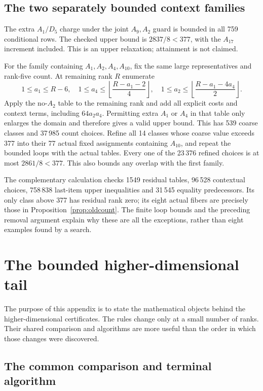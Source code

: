 \documentclass[11pt]{article}
\theoremstyle{remark}\newtheorem{remark}[theorem]{Remark}
\begin{document}
\subsection{The two separately bounded context families}

The extra $A_1/D_5$ charge under the joint $A_9,A_2$ guard is
bounded in all 759 conditional rows. The checked upper bound is
$2837/8<377$, with the $A_{17}$ increment included. This is an
upper relaxation; attainment is not claimed.

For the family containing $A_1,A_2,A_4,A_{10}$, fix the same
large representatives and rank-five count. At remaining rank $R$
enumerate
\[
 1\le a_1\le R-6,\quad
 1\le a_4\le\left\lfloor\frac{R-a_1-2}{4}\right\rfloor,
 \quad
 1\le a_2\le\left\lfloor\frac{R-a_1-4a_4}{2}\right\rfloor.
\]
Apply the no-$A_2$ table to the remaining rank and add all explicit
costs and context terms, including $64a_2a_4$. Permitting extra
$A_1$ or $A_4$ in that table only enlarges the domain and therefore
gives a valid upper bound. This has 539 coarse classes and
37\,985 count choices. Refine all 14 classes whose coarse value
exceeds 377 into their 77 actual fixed assignments containing
$A_{10}$, and repeat the bounded loops with the actual tables.
Every one of the 23\,376 refined choices is at most $2861/8<377$.
This also bounds any overlap with the first family.

The complementary calculation checks 1549 residual tables,
96\,528 contextual choices, 758\,838 last-item upper inequalities
and 31\,545 equality predecessors. Its only class above 377 has
residual rank zero; its eight actual fibers are precisely those
in Proposition~\ref{prop:oldcount}. The finite loop bounds and
the preceding removal argument explain why these are all the
exceptions, rather than eight examples found by a search.

\section{The bounded higher-dimensional tail}\label{app:tail}

The purpose of this appendix is to state the mathematical objects behind
the higher-dimensional certificates. The rules change only at a small
number of ranks. Their shared comparison and algorithms are more useful
than the order in which those changes were discovered.

\subsection{The common comparison and terminal algorithm}
\end{document}
